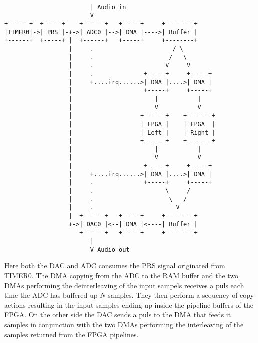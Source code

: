 \newpage
\begin{verbatim}
	
                        | Audio in
                        V
+------+  +-----+    +------+   +-----+     +--------+
|TIMER0|->| PRS |-+->| ADC0 |-->| DMA |---->| Buffer |
+------+  +-----+ |  +------+   +-----+     +--------+
                  |     .                      / \
                  |     .                     /   \
                  |     .                    V     V
                  |     .              +-----+     +-----+
                  |     +....irq......>| DMA |....>| DMA |
                  |                    +-----+     +-----+
                  |                       |           |
                  |                       V           V
                  |                   +------+    +-------+
                  |                   | FPGA |    | FPGA  |
                  |                   | Left |    | Right |
                  |                   +------+    +-------+
                  |                       |           |
                  |                       V           V
                  |                    +-----+     +-----+
                  |     +....irq......>| DMA |....>| DMA |
                  |     .              +-----+     +-----+
                  |     .                    \     /
                  |     .                     \   /
                  |     .                       V
                  |  +------+   +-----+     +--------+
                  +->| DAC0 |<--| DMA |<----| Buffer |
                     +------+   +-----+     +--------+
                        |
                        V Audio out
\end{verbatim} 

Here both the DAC and ADC consumes the PRS signal originated from TIMER0. The DMA copying 
from the ADC to the RAM buffer and the two DMAs performing the deinterleaving of the input
sampels receives a puls each time the ADC has buffered up $N$ samples. They then perform
a sequency of copy actions resulting in the input samples ending up inside the pipeline
buffers of the FPGA. On the other side the DAC sends a puls to the DMA that feeds it samples
in conjunction with the two DMAs performing the interleaving of the samples returned from the
FPGA pipelines.

